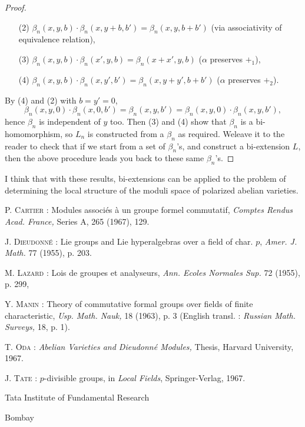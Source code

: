 \begin{proof}
\begin{itemize}
\item[(2)] $\beta_{n}(x,y,b)\cdot \beta_{n}(x,y+b,b')=\beta_{n}(x,y,b+b')$ (via associativity of equivalence relation),

\item[(3)] $\beta_{n}(x,y,b)\cdot \beta_{n}(x',y,b)=\beta_{n}(x+x',y,b)$ ($\alpha$ preserves $+_{1}$),

\item[(4)] $\beta_{n}(x,y,b)\cdot \beta_{n}(x,y',b')=\beta_{n}(x,y+y',b+b')$ ($\alpha$ preserves $+_{2}$).
\end{itemize}
By (4) and (2) with $b=y'=0$,
$$
\beta_{n}(x,y,0)\cdot \beta_{n}(x,0,b')=\beta_{n}(x,y,b')=\beta_{n}(x,y,0)\cdot \beta_{n}(x,y,b'),
$$
hence $\beta_{n}$ is independent of $y$ too. Then (3) and (4) show that $\beta_{n}$ is a bi-homomorphism, so $L_{n}$ is constructed from a $\beta_{n}$ as required. We\pageoriginale leave it to the reader to check that if we start from a set of $\beta_{n}$'s, and construct a bi-extension $L$, then the above procedure leads you back to these same $\beta_{n}$'s.
\end{proof}

I think that with these results, bi-extensions can be applied to the problem of determining the local structure of the moduli space of polarized abelian varieties.

\begin{thebibliography}{99}
 \textsc{P. Cartier :} Modules associ\'es \`a un groupe formel commutatif, {\em Comptes Rendus Acad. France,} Series A, 265 (1967), 129.

 \textsc{J. Dieudonn\'e :} Lie groups and Lie hyperalgebras over a field of char. $p$, {\em Amer. J. Math.} 77 (1955), p. 203.

 \textsc{M. Lazard :} Lois de groupes et analyseurs, {\em Ann. Ecoles Normales Sup.} 72 (1955), p. 299, 

 \textsc{Y. Manin :} Theory of commutative formal groups over fields of finite characteristic, {\em Usp. Math. Nauk,} 18 (1963), p. 3 (English transl. : {\em Russian Math. Surveys,} 18, p. 1).

 \textsc{T. Oda :} {\em Abelian Varieties and Dieudonn\'e Modules,} Thesis, Harvard University, 1967.

 \textsc{J. Tate :} $p$-divisible groups, in {\em Local Fields}, Springer-Verlag, 1967.

\end{thebibliography}

\bigskip

\noindent
Tata Institute of Fundamental Research

\noindent
Bombay
